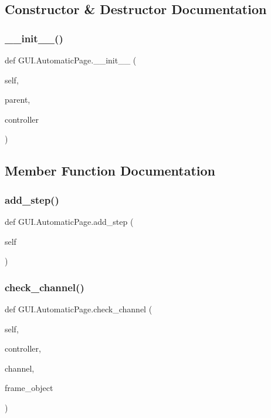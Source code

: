 \subsection{Constructor \& Destructor Documentation}
\mbox{\label{class_g_u_i_1_1_automatic_page_a24bc2991fd2515ec4341b3eaa8c682c6}} 
\subsubsection{\texorpdfstring{\_\_init\_\_()}{\_\_init\_\_()}}
{\footnotesize\ttfamily def G\+U\+I.\+Automatic\+Page.\+\_\+\+\_\+init\+\_\+\+\_\+ (\begin{DoxyParamCaption}\item[{}]{self,  }\item[{}]{parent,  }\item[{}]{controller }\end{DoxyParamCaption})}



\subsection{Member Function Documentation}
\mbox{\label{class_g_u_i_1_1_automatic_page_a8ebd8c7b250fbb945a7255ba42bed48d}} 
\subsubsection{\texorpdfstring{add\_step()}{add\_step()}}
{\footnotesize\ttfamily def G\+U\+I.\+Automatic\+Page.\+add\+\_\+step (\begin{DoxyParamCaption}\item[{}]{self }\end{DoxyParamCaption})}

\mbox{\label{class_g_u_i_1_1_automatic_page_a4281ddefe815f6e04513e8e0342974b6}} 
\subsubsection{\texorpdfstring{check\_channel()}{check\_channel()}}
{\footnotesize\ttfamily def G\+U\+I.\+Automatic\+Page.\+check\+\_\+channel (\begin{DoxyParamCaption}\item[{}]{self,  }\item[{}]{controller,  }\item[{}]{channel,  }\item[{}]{frame\+\_\+object }\end{DoxyParamCaption})}

